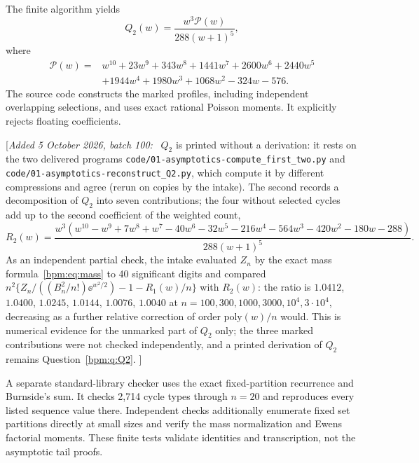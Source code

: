 \documentclass[11pt,a4paper]{article}
\theoremstyle{remark}\newtheorem{remark}[theorem]{Remark}%
\newenvironment{writenote}{\par\smallskip\noindent\small[\textit{Added 5 October 2026, batch 100:}\ }{]\par\smallskip}
\begin{document}
The finite algorithm yields
\begin{equation}\label{bpm:eq:Q2}
 Q_2(w)=\frac{w^3\mathcal P(w)}{288(w+1)^5},
\end{equation}
where
\begin{align*}
 \mathcal P(w)={}&w^{10}+23w^9+343w^8+1441w^7+2600w^6+2440w^5\\
 &+1944w^4+1980w^3+1068w^2-324w-576.
\end{align*}
The source code constructs the marked profiles, including independent overlapping selections, and uses exact rational Poisson moments. It explicitly rejects floating coefficients.

\begin{writenote}
$Q_2$ is printed without a derivation: it rests on the two delivered
programs \nolinkurl{code/01-asymptotics-compute_first_two.py} and
\nolinkurl{code/01-asymptotics-reconstruct_Q2.py}, which compute it by
different compressions and agree (rerun on copies by the intake). The
second records a decomposition of $Q_2$ into seven contributions; the four
without selected cycles add up to the second coefficient of the weighted
count,
\[
 R_2(w)=\frac{w^3(w^{10}-w^9+7w^8+w^7-40w^6-32w^5-216w^4-564w^3-420w^2-180w-288)}{288(w+1)^5}.
\]
As an independent partial check, the intake evaluated $Z_n$ by the exact
mass formula~\eqref{bpm:eq:mass} to 40 significant digits and compared
$n^2\{Z_n/((B_n^2/n!)\ee^{w^2/2})-1-R_1(w)/n\}$ with $R_2(w)$: the ratio is
$1.0412$, $1.0400$, $1.0245$, $1.0144$, $1.0076$, $1.0040$ at
$n=100,300,1000,3000,10^4,3\cdot10^4$, decreasing as a further relative
correction of order $\mathrm{poly}(w)/n$ would. This is numerical evidence
for the unmarked part of $Q_2$ only; the three marked contributions were
not checked independently, and a printed derivation of $Q_2$ remains
Question~\ref{bpm:q:Q2}.
\end{writenote}

A separate standard-library checker uses the exact fixed-partition recurrence and Burnside's sum. It checks 2,714 cycle types through $n=20$ and reproduces every listed sequence value there. Independent checks additionally enumerate fixed set partitions directly at small sizes and verify the mass normalization and Ewens factorial moments. These finite tests validate identities and transcription, not the asymptotic tail proofs.
\end{document}
